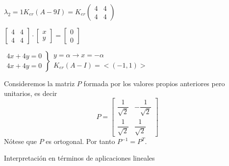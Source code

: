 \documentclass[12pt]{article}
\begin{document}
$\lambda_2=1$\hspace{1cm}$K_{er}(A-9I)=K_{er}\begin{pmatrix}
4 & 4 \\ 
4 & 4
\end{pmatrix} $

$\begin{bmatrix}
4 & 4 \\ 
4 & 4
\end{bmatrix}\cdot\begin{bmatrix}
x\\
y
\end{bmatrix}=\begin{bmatrix}
0\\
0
\end{bmatrix} $

$\left.\begin{array}{r}
4x+4y=0\\
4x+4y=0
\end{array}\right\rbrace\begin{array}{l}
y=\alpha\longrightarrow x=-\alpha\\
K_{er}(A-I)=<(-1,1)>
\end{array}$

Consideremos la matriz $P$ formada por los valores propios anteriores pero unitarios, es decir \[P=\begin{bmatrix}
\dfrac{1}{\sqrt{2}} & -\dfrac{1}{\sqrt{2}} \\ 
\dfrac{1}{\sqrt{2}} & \dfrac{1}{\sqrt{2}}
\end{bmatrix} \]
Nótese que $P$ es ortogonal. Por tanto $P^{-1}=P^T$.

Interpretación en términos de aplicaciones lineales
\end{document}
